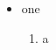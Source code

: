 \begin{itemize}
  \item one
        \begin{enumerate}
          \item a
        \end{enumerate}
\end{itemize}
